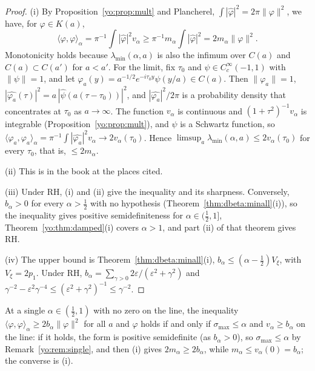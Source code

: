 \begin{proof}
(i) By Proposition~\ref{yo:prop:mult} and Plancherel, $\int|\widehat\varphi|^2=2\pi\|\varphi\|^2$, we have, for $\varphi\in K(a)$,
\[
\langle\varphi,\varphi\rangle_\alpha=\pi^{-1}\int|\widehat\varphi|^2v_\alpha\ge\pi^{-1}m_\alpha\int|\widehat\varphi|^2=2m_\alpha\|\varphi\|^2 .
\]
Monotonicity holds because $\lambda_{\min}(\alpha,a)$ is also the infimum over $C(a)$ and $C(a)\subset C(a')$ for $a<a'$. For the limit, fix $\tau_0$ and $\psi\in C_c^\infty(-1,1)$ with $\|\psi\|=1$, and let $\varphi_a(y)=a^{-1/2}e^{-i\tau_0y}\psi(y/a)\in C(a)$. Then $\|\varphi_a\|=1$, $|\widehat{\varphi_a}(\tau)|^2=a\,|\widehat\psi(a(\tau-\tau_0))|^2$, and $|\widehat{\varphi_a}|^2/2\pi$ is a probability density that concentrates at $\tau_0$ as $a\to\infty$. The function $v_\alpha$ is continuous and $(1+\tau^2)^{-1}v_\alpha$ is integrable (Proposition~\ref{yo:prop:mult}), and $\widehat\psi$ is a Schwartz function, so $\langle\varphi_a,\varphi_a\rangle_\alpha=\pi^{-1}\int|\widehat{\varphi_a}|^2v_\alpha\to2v_\alpha(\tau_0)$. Hence $\limsup_a\lambda_{\min}(\alpha,a)\le2v_\alpha(\tau_0)$ for every $\tau_0$, that is, $\le2m_\alpha$.

(ii) This is in the book at the places cited.

(iii) Under RH, (i) and (ii) give the inequality and its sharpness. Conversely, $b_\alpha>0$ for every $\alpha>\frac12$ with no hypothesis (Theorem~\ref{thm:dbeta:minall}(i)), so the inequality gives positive semidefiniteness for $\alpha\in(\frac12,1]$, Theorem~\ref{yo:thm:damped}(i) covers $\alpha>1$, and part (ii) of that theorem gives RH.

(iv) The upper bound is Theorem~\ref{thm:dbeta:minall}(i), $b_\alpha\le(\alpha-\frac12)V_\xi$, with $V_\xi=2p_1$. Under RH, $b_\alpha=\sum_{\gamma>0}2\varepsilon/(\varepsilon^2+\gamma^2)$ and $\gamma^{-2}-\varepsilon^2\gamma^{-4}\le(\varepsilon^2+\gamma^2)^{-1}\le\gamma^{-2}$.
\end{proof}

\begin{remark}\label{yo:rem:line}
At a single $\alpha\in(\frac12,1)$ with no zero on the line, the inequality $\langle\varphi,\varphi\rangle_\alpha\ge2b_\alpha\|\varphi\|^2$ for all $a$ and $\varphi$ holds if and only if $\sigma_{\max}\le\alpha$ and $v_\alpha\ge b_\alpha$ on the line: if it holds, the form is positive semidefinite (as $b_\alpha>0$), so $\sigma_{\max}\le\alpha$ by Remark~\ref{yo:rem:single}, and then (i) gives $2m_\alpha\ge2b_\alpha$, while $m_\alpha\le v_\alpha(0)=b_\alpha$; the converse is (i).
\end{remark}

